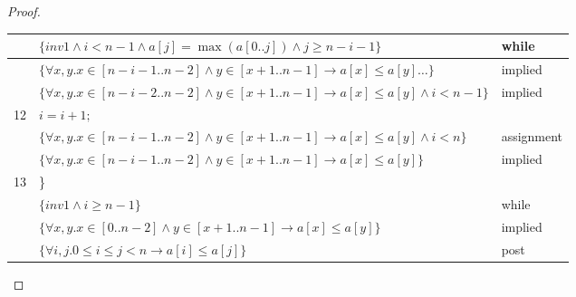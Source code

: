 \documentclass{article}
\begin{document}
\begin{proof}
\begin{tabular}{lll}
& $\{inv1 \land i < n - 1 \land a[j] = \max(a[0 .. j]) \land j \ge n - i - 1\}$ & while \\ \hline
& $\{\forall x, y. x \in [n - i - 1 .. n - 2] \land y \in [x + 1 .. n - 1] \to a[x] \le a[y] \dots\}$ & implied \\ \hline
& $\{\forall x, y. x \in [n - i - 2 .. n - 2] \land y \in [x + 1 .. n - 1] \to a[x] \le a[y] \land i < n - 1\}$ & implied \\ \hline
12 & $i = i + 1;$ & \\ \hline
& $\{\forall x, y. x \in [n - i - 1 .. n - 2] \land y \in [x + 1 .. n - 1] \to a[x] \le a[y] \land i < n\}$ & assignment \\ \hline
& $\{\forall x, y. x \in [n - i - 1 .. n - 2] \land y \in [x + 1 .. n - 1] \to a[x] \le a[y]\}$ & implied \\ \hline
13 & \} & \\ \hline
& $\{inv1 \land i \ge n - 1\}$ & while \\ \hline
& $\{\forall x, y. x \in [0 .. n - 2] \land y \in [x + 1 .. n - 1] \to a[x] \le a[y]\}$ & implied \\ \hline
& $\{\forall i, j. 0 \le i \le j < n \to a[i] \le a[j]\}$ & post \\ \hline
\end{tabular}
\end{proof}
\end{document}
